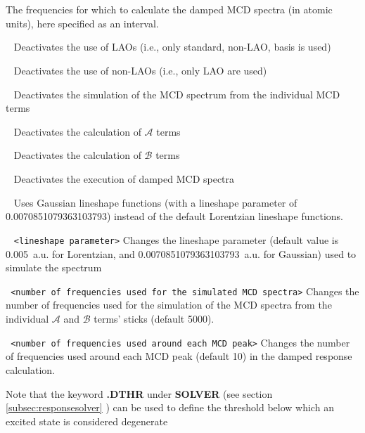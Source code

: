 \begin{description}
The frequencies for which to calculate the damped MCD spectra (in atomic units), here specified as an interval.
\item[\Key{NO LONDON}] \verb| | \newline
Deactivates the use of LAOs (i.e., only standard, non-LAO, basis is used)
\item[\Key{NO NOLONDON}] \verb| | \newline
Deactivates the use of non-LAOs (i.e., only LAO are used)
\item[\Key{NO SIMULATE}] \verb| | \newline
Deactivates the simulation of the MCD spectrum from the individual MCD terms
\item[\Key{NO ATERM}] \verb| | \newline
Deactivates the calculation of $\mathcal{A}$ terms
\item[\Key{NO BTERM}] \verb| | \newline
Deactivates the calculation of $\mathcal{B}$ terms
\item[\Key{NO DAMPED}] \verb| | \newline
Deactivates the execution of damped MCD spectra
\item[\Key{GAUSSIAN}] \verb| | \newline
Uses Gaussian lineshape functions (with a lineshape parameter of 0.0070851079363103793) 
instead of the default Lorentzian lineshape functions.
\item[\Key{LINESHAPEPARAM}] \verb| | \newline
\verb|<lineshape parameter>|\newline
Changes the lineshape parameter (default value is 0.005~a.u. for Lorentzian, 
and 0.0070851079363103793~a.u. for Gaussian) used to simulate the spectrum
\item[\Key{NSTEPS}] \verb| | \newline
\verb|<number of frequencies used for the simulated MCD spectra>|\newline
Changes the number of frequencies used for the simulation of the MCD spectra from the 
individual $\mathcal{A}$ and $\mathcal{B}$ terms' sticks 
(default 5000).
\item[\Key{NVECFORPEAK}] \verb| | \newline
\verb|<number of frequencies used around each MCD peak>|\newline
Changes the number of frequencies used around each MCD peak (default 10) in the damped response calculation.
\end{description}
Note that the keyword {\bf .DTHR} under {\bf *SOLVER} (see section \ref{subsec:responsesolver} ) can be used to define the threshold below which an excited state is considered degenerate

